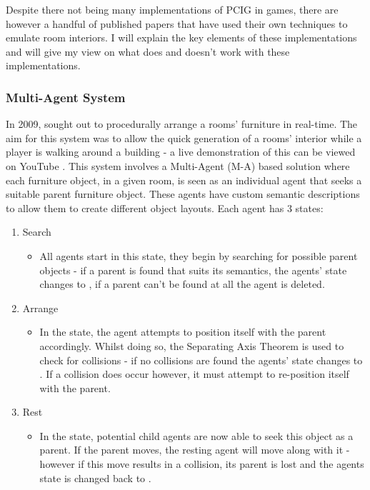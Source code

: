\bigskip
Despite there not being many implementations of PCIG in games, there are however a handful of published papers that have used their own techniques to emulate room interiors. I will explain the key elements of these implementations and will give my view on what does and doesn't work with these implementations.

\bigskip
\subsubsection{Multi-Agent System}
In 2009,  \cite{real-time-walkthroughs} sought out to procedurally arrange a rooms' furniture in real-time. 
The aim for this system was to allow the quick generation of a rooms' interior while a player is walking around a building - a live demonstration of this can be viewed on YouTube \cite{youtube:real-time-walkthroughs}.
This system involves a Multi-Agent (M-A) based solution where each furniture object, in a given room, is seen as an individual agent that seeks a suitable parent furniture object. These agents have custom semantic descriptions to allow them to create different object layouts. %
Each agent has 3 states:
\begin{enumerate}
    \item Search
        \begin{itemize}
            \item All agents start in this state, they begin by searching for possible parent objects - if a parent is found that suits its semantics, the agents' state changes to , if a parent can't be found at all the agent is deleted.
        \end{itemize}
    \item Arrange
        \begin{itemize}
            \item In the  state, the agent attempts to position itself with the parent accordingly. Whilst doing so, the Separating Axis Theorem \cite{separating-axis-thereom} is used to check for collisions - if no collisions are found the agents' state changes to . If a collision does occur however, it must attempt to re-position itself with the parent.
        \end{itemize}
    \item Rest
        \begin{itemize}
            \item In the  state, potential child agents are now able to seek this object as a parent. If the parent moves, the resting agent will move along with it - however if this move results in a collision, its parent is lost and the agents state is changed back to .
        \end{itemize}
\end{enumerate}
